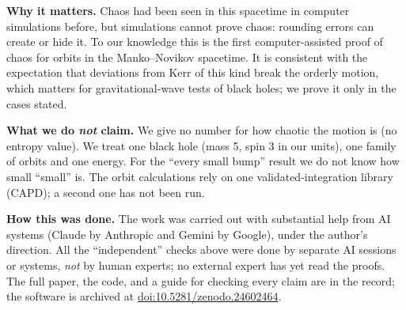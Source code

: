 \documentclass[11pt]{article}
\begin{document}
\textbf{Why it matters.} Chaos had been seen in this spacetime in computer simulations before, but simulations cannot
prove chaos: rounding errors can create or hide it. To our knowledge this is the first computer-assisted proof of chaos
for orbits in the Manko--Novikov spacetime. It is consistent with the expectation that deviations from Kerr of this kind break the
orderly motion, which matters for gravitational-wave tests of black holes; we prove it only in the cases stated.

\textbf{What we do \emph{not} claim.} We give no number for how chaotic the motion is (no entropy value). We treat one
black hole (mass 5, spin 3 in our units), one family of orbits and one energy. For the ``every small bump'' result we
do not know how small ``small'' is. The orbit calculations rely on one validated-integration library (CAPD); a second
one has not been run.

\textbf{How this was done.} The work was carried out with substantial help from AI systems (Claude by Anthropic and
Gemini by Google), under the author's direction. All the ``independent'' checks above were done by separate AI sessions
or systems, \emph{not} by human experts; no external expert has yet read the proofs. The full paper, the code, and a
guide for checking every claim are in the record; the software is archived at
\href{https://doi.org/10.5281/zenodo.24602464}{doi:10.5281/zenodo.24602464}.
\end{document}

